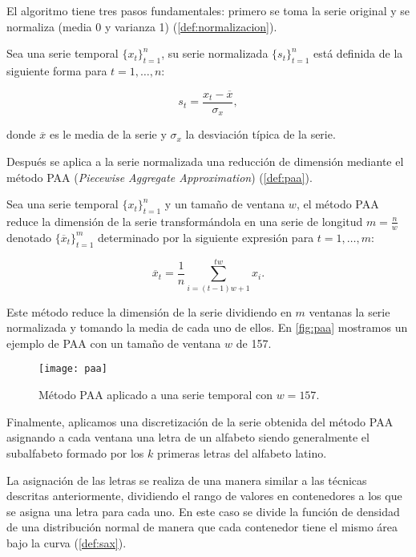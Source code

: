 El algoritmo tiene tres pasos fundamentales: primero se toma la serie original y se normaliza (media 0 y varianza 1) (\autoref{def:normalizacion}).

\begin{definicion}[Normalización]
  Sea una serie temporal $\{x_t\}_{t = 1}^n$, su serie normalizada $\{s_t\}_{t = 1}^n$ está definida de la siguiente forma para $t = 1, \ldots, n$:

  $$s_t = \dfrac{x_t - \overline{x}}{\sigma_x},$$

  donde $\overline{x}$ es le media de la serie y $\sigma_x$ la desviación típica de la serie.
  \label{def:normalizacion}
\end{definicion}

Después se aplica a la serie normalizada una reducción de dimensión mediante el método PAA (\emph{Piecewise Aggregate Approximation}) \cite{keogh2001dimensionality} (\autoref{def:paa}).

\begin{definicion}[PAA]
  Sea una serie temporal $\{x_t\}_{t = 1}^n$ y un tamaño de ventana $w$, el método PAA reduce la dimensión de la serie transformándola en una serie de longitud $m = \frac{n}{w}$ denotado $\{\overline{x}_t\}_{t = 1}^m$ determinado por la siguiente expresión para $t = 1, \ldots, m$:

  $$\overline{x}_t = \dfrac{1}{n} \sum \limits_{i = (t-1)w + 1}^{tw} x_i.$$
  \label{def:paa}
\end{definicion}

Este método reduce la dimensión de la serie dividiendo en $m$ ventanas la serie normalizada y tomando la media de cada uno de ellos. En \autoref{fig:paa} mostramos un ejemplo de PAA con un tamaño de ventana $w$ de 157.

\begin{figure}[htpb]
  \centering
  \texttt{[image: paa]}
  \caption{Método PAA aplicado a una serie temporal con $w = 157$.}
  \label{fig:paa}
\end{figure}

Finalmente, aplicamos una discretización de la serie obtenida del método PAA asignando a cada ventana una letra de un alfabeto siendo generalmente el subalfabeto formado por los $k$ primeras letras del alfabeto latino.

La asignación de las letras se realiza de una manera similar a las técnicas descritas anteriormente, dividiendo el rango de valores en contenedores a los que se asigna una letra para cada uno. En este caso se divide la función de densidad de una distribución normal de manera que cada contenedor tiene el mismo área bajo la curva (\autoref{def:sax}).

